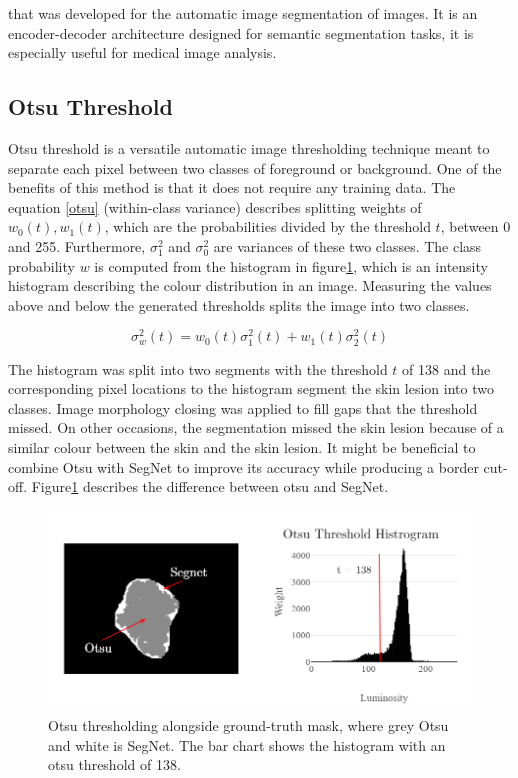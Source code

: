 that was developed for the automatic image segmentation of images. It is an encoder-decoder architecture designed for semantic segmentation tasks, it is especially useful for medical image analysis\cite{zhou2020}.  

\subsection{Otsu Threshold}
Otsu threshold is a versatile automatic image thresholding technique meant to separate each pixel between two classes of foreground or background. One of the benefits of this method is that it does not require any training data. The equation \ref{otsu} (within-class variance) describes splitting weights of $w_0(t),w_1(t)$, which are the probabilities divided by the threshold $t$, between 0 and 255. Furthermore, $\sigma_1^2$ and $\sigma_0^2$ are variances of these two classes. The class probability $w$ is computed from the histogram in figure\ref{otsu2}, which is an intensity histogram describing the colour distribution in an image. Measuring the values above and below the generated thresholds splits the image into two classes.

\begin{equation}
\sigma_w^2(t) = w_0(t)\sigma_1^2(t) + w_1(t)\sigma_2^2(t)
\end{equation}\label{otsu}

The histogram was split into two segments with the threshold $t$ of 138 and the corresponding pixel locations to the histogram segment the skin lesion into two classes. Image morphology closing was applied to fill gaps that the threshold missed. On other occasions, the segmentation missed the skin lesion because of a similar colour between the skin and the skin lesion. It might be beneficial to combine Otsu with SegNet to improve its accuracy while producing a border cut-off. Figure\ref{otsu2} describes the difference between otsu and SegNet.

\begin{figure}
\centering
\includegraphics[scale=0.7]{images/otsu3.png}
\caption{Otsu thresholding alongside ground-truth mask, where grey Otsu and white is SegNet. The bar chart shows the histogram with an otsu threshold of 138.}\label{otsu2}
\end{figure}

